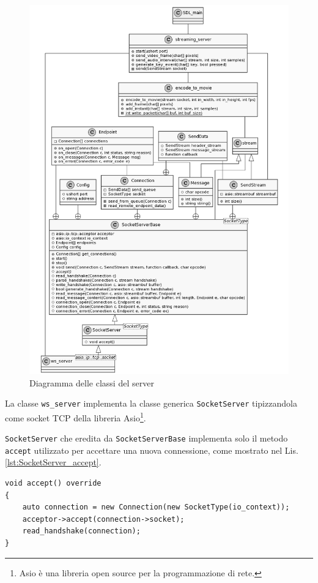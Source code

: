 \begin{figure}[H]
	\includegraphics[width=\linewidth]{immagini/class_server_and_encoding_full}
	\caption{Diagramma delle classi del server}
	\label{fig:class_server_and_encoding_full}
\end{figure}

La classe \verb|ws_server| implementa la classe generica \verb|SocketServer| tipizzandola come socket TCP della libreria Asio\footnote{Asio è una libreria open source per la programmazione di rete.}.

\verb|SocketServer| che eredita da \verb|SocketServerBase| implementa solo il metodo \verb|accept| utilizzato per accettare una nuova connessione, come mostrato nel Lis. \ref{lst:SocketServer_accept}.

\begin{lstlisting}[caption=Funzione accept della classe SocketServer, label={lst:SocketServer_accept}]
void accept() override
{
	auto connection = new Connection(new SocketType(io_context));
	acceptor->accept(connection->socket);
	read_handshake(connection);
}
\end{lstlisting}

